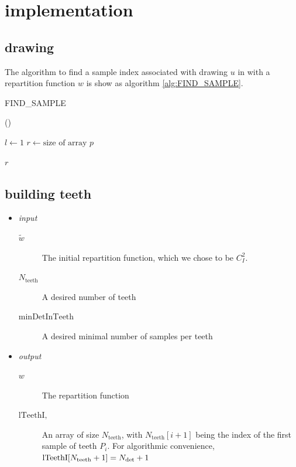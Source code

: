 \documentclass[./thesis.tex]{subfiles}
\newcommand{\minDetInTeeth}{\text{minDetInTeeth}}
\newcommand{\Nteeth}{N_\text{teeth}}
\newcommand{\lTeethI}{\text{lTeethI}}
\begin{document}
\section{implementation}



\subsection{drawing}

The algorithm to find a sample index associated with drawing $u$ in with a repartition function $w$ is show as algorithm \ref{alg:FIND_SAMPLE}.

\begin{algorithm}
\label{alg:FIND_SAMPLE}
\caption{FIND\_SAMPLE}
	
	\Fn(){}{
		$l \gets 1$ \;
		$r \gets \text{size of array } p$ \;
		
		\KwRet $r$ \;
	}
\end{algorithm}




\subsection{building teeth}

\begin{itemize}

\item
\emph{input}
\begin{description}
\item[$\tilde w$]
The initial repartition function, which we chose to be $C_I^2$.
\item[$\Nteeth$]
A desired number of teeth
\item[$\minDetInTeeth$]
A desired minimal number of samples per teeth
\end{description}

\item
\emph{output}
\begin{description}
\item[$w$]
The repartition function
\item[$\lTeethI, $]
An array of size $\Nteeth$, with $\Nteeth[i+1]$ being the index of the first sample of teeth $P_i$. For algorithmic convenience, $\lTeethI[\Nteeth+1] = \Ndet+1$  
\end{description}
\end{itemize}
\end{document}
